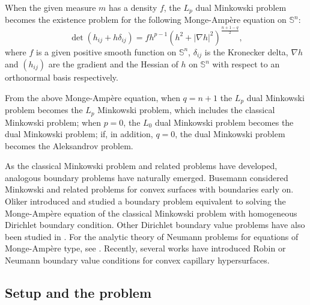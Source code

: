 \documentclass[11pt]{amsart}
\newcommand{\uS}{\mathbb{S}^{n}}
\numberwithin{equation} {section}
\numberwithin{equation}{section}
\begin{document}
When the given measure $m$ has a density $f$, the $L_p$ dual Minkowski problem becomes the existence problem for the following Monge-Amp\`ere equation on $\uS$:
$$\det(h_{ij}+ h\delta_{ij} ) = fh^{p-1}(h^2 + |\nabla h|^2)^{\frac{n+1-q}{2}},$$
where $f$ is a given positive smooth function on $\uS$, $\delta_{ij}$ is the Kronecker delta, $\nabla h$ and $(h_{ij})$ are the gradient and the Hessian of $h$ on $\uS$ with respect to an orthonormal basis respectively.

From the above Monge-Amp\`ere equation, when $q=n+1$ the $L_p$ dual Minkowski problem becomes the $L_p$ Minkowski problem, which includes the classical Minkowski problem; when $p=0$, the $L_0$ dual Minkowski problem becomes the dual Minkowski problem; if, in addition, $q=0$, the dual Minkowski problem becomes the Aleksandrov problem.

As the classical Minkowski problem and related problems have developed, analogous boundary problems have naturally emerged. Busemann \cite{Busemann59} considered Minkowski and related problems for convex surfaces with boundaries early on. Oliker \cite{Oli82} introduced and studied a boundary problem equivalent to solving the Monge-Amp\`ere equation of the classical Minkowski problem with homogeneous Dirichlet boundary condition. Other Dirichlet boundary value problems have also been studied in \cite{CW95, Pog78, Sch18, Sch03}. For the analytic theory of Neumann problems for equations of Monge-Amp\`ere type, see \cite{LTU86}. Recently, several works have introduced Robin or Neumann boundary value conditions for convex capillary hypersurfaces.

\subsection{Setup and the problem }
\end{document}
